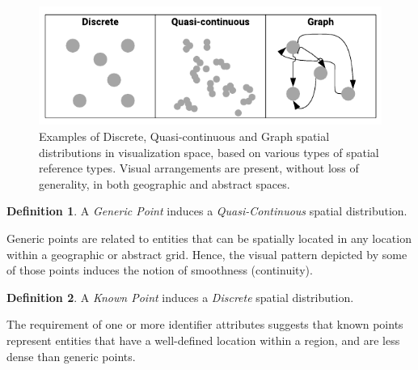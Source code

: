 \documentclass[]{interact}
\theoremstyle{plain}%
\theoremstyle{definition}
\theoremstyle{remark}
\theoremstyle{definition}
\newtheorem{defn}{Definition}[section]
\begin{document}
\begin{figure}[htbp]
	\centering
	\includegraphics[width=0.8\linewidth]{images/spatialdistribution.pdf}
	\caption{Examples of Discrete, Quasi-continuous and Graph spatial distributions in visualization space, based on various types of spatial reference types. Visual arrangements are present, without loss of generality, in both geographic and abstract spaces.}
	\label{fig:spatialdistribution}
\end{figure}

\begin{defn}\label{dfn:genericpoint_distribution}
	A \emph{Generic Point} induces a \emph{Quasi-Continuous} spatial distribution.
\end{defn}

Generic points are related to entities that can be spatially located in any location within a geographic or abstract grid. Hence, the visual pattern depicted by some of those points induces the notion of smoothness (continuity).

%

\begin{defn}\label{dfn:knownpoint_distribution}
	A \emph{Known Point} induces a \emph{Discrete} spatial distribution.
\end{defn}

The requirement of one or more identifier attributes suggests that known points represent entities that have a well-defined location within a region, and are less dense than generic points.

%
\end{document}
